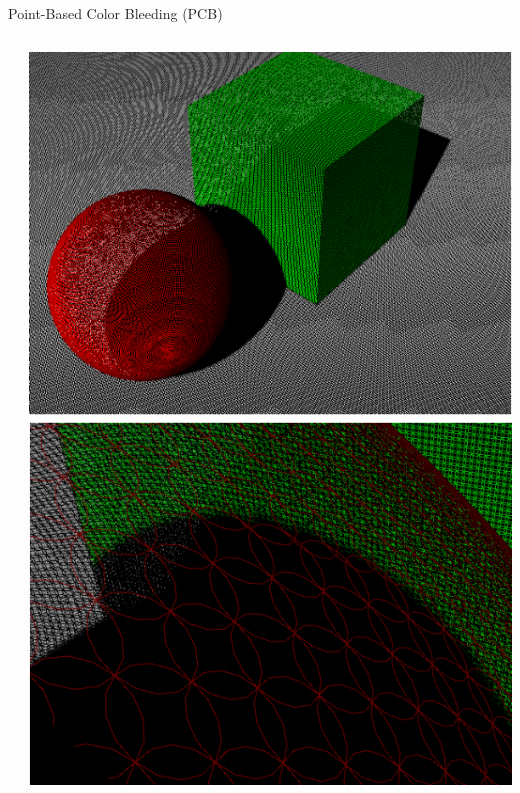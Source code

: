 \documentclass[10pt,compress,professionalfont]{beamer}
\begin{document}
\begin{frame}{Point-Based Color Bleeding (PCB)}
\begin{columns}
\begin{column}{0.65\textwidth}
        \end{column}
        \begin{column}{0.35\textwidth}
            \vspace{-4mm}
            \includegraphics[width=\textwidth]{../img/external/pcb}\\
        \end{column}
    \end{columns}

\end{frame}
\end{document}
